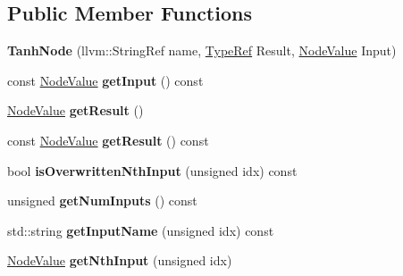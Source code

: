\subsection*{Public Member Functions}
\begin{DoxyCompactItemize}
\item 
\mbox{\label{classglow_1_1_tanh_node_a7f10878ef5d82f228046273deb725d4a}} 
{\bfseries Tanh\+Node} (llvm\+::\+String\+Ref name, \hyperlink{structglow_1_1_type}{Type\+Ref} Result, \hyperlink{structglow_1_1_node_value}{Node\+Value} Input)
\item 
\mbox{\label{classglow_1_1_tanh_node_a11aa3f369feb436e4e58d780e03aa549}} 
const \hyperlink{structglow_1_1_node_value}{Node\+Value} {\bfseries get\+Input} () const
\item 
\mbox{\label{classglow_1_1_tanh_node_ab69daf091a764421d1b5e500734ea6a7}} 
\hyperlink{structglow_1_1_node_value}{Node\+Value} {\bfseries get\+Result} ()
\item 
\mbox{\label{classglow_1_1_tanh_node_a1bb1d6b6eab2e945e91c9a655ee3ee7c}} 
const \hyperlink{structglow_1_1_node_value}{Node\+Value} {\bfseries get\+Result} () const
\item 
\mbox{\label{classglow_1_1_tanh_node_a11cd34b66dd8c0a55cbd63f59a0a70e6}} 
bool {\bfseries is\+Overwritten\+Nth\+Input} (unsigned idx) const
\item 
\mbox{\label{classglow_1_1_tanh_node_a2addeaf0a686dd5a6c0c8c6940951353}} 
unsigned {\bfseries get\+Num\+Inputs} () const
\item 
\mbox{\label{classglow_1_1_tanh_node_ae33b6cbdbc3b5acb78ce84378bc03638}} 
std\+::string {\bfseries get\+Input\+Name} (unsigned idx) const
\item 
\mbox{\label{classglow_1_1_tanh_node_ae08c8497c9710c7fd2ed72ccfc1522df}} 
\hyperlink{structglow_1_1_node_value}{Node\+Value} {\bfseries get\+Nth\+Input} (unsigned idx)
\item 
\mbox{\label{classglow_1_1_tanh_node_a51ad5ddb68ccf2edf76eef90a9ba9b7e}} 

\end{DoxyCompactItemize}

